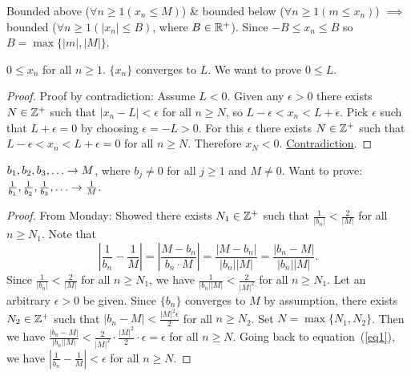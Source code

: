 \documentclass[]{article}
\begin{document}
Bounded above ($\forall n\geq1(x_n\leq M)$) \& bounded below ($\forall n\geq 1(m\leq x_n)$) $\implies $ bounded ($\forall n\geq 1(|x_n|\leq B)$, where $B\in\mathbb{R}^+$). Since $-B\leq x_n \leq B$ so $B=\max{\{|m|,|M|\}}$.
\begin{example}
	[Exam 1, 8.] $0\leq x_n$ for all $n\geq 1$. $\{x_n\}$ converges to $L$. We want to prove \ul{$0\leq L$}. 
\end{example}
\begin{proof}
	Proof by contradiction: Assume $L<0$. Given any $\epsilon>0$ there exists $N\in\mathbb{Z}^+$ such that $|x_n - L|<\epsilon$ for all $n\geq N$, so $L-\epsilon<x_n<L+\epsilon$. Pick $\epsilon$ such that $L+\epsilon=0$ by choosing $\epsilon=-L>0$. For this $\epsilon$ there exists $N\in \mathbb{Z}^+$ such that $L-\epsilon<x_n<L+\epsilon=0$ for all $n\geq N$. Therefore $x_N<0$. \ul{Contradiction}.
\end{proof}
\begin{recall}
	$b_1, b_2, b_3,\dots \ra M$, where $b_j \neq 0$ for all $j\geq 1$ and $M\neq0$. Want to prove: $\frac{1}{b_1},\frac{1}{b_2},\frac{1}{b_3},\dots \ra \frac{1}{M}$. 
\end{recall}
\begin{proof}
	From Monday: Showed there exists $N_1 \in \mathbb{Z}^+$ such that $\frac{1}{|b_n|}<\frac{2}{|M|}$ for all $n\geq N_1$. Note that
	\begin{equation}
		\left|\frac{1}{b_n}-\frac{1}{M}\right| = \left| \frac{M-b_n}{b_n\cdot M}\right| = \frac{|M-b_n|}{|b_n||M|} = \frac{|b_n-M|}{|b_n||M|}.
		\label{eq1}
	\end{equation}
	Since $\frac{1}{|b_n|}<\frac{2}{|M|}$ %
	for all $n\geq N_1$, we have %
	$\frac{1}{|b_n||M|} < \frac{2}{|M|^2}$ for all $n\geq N_1$.
	Let an arbitrary $\epsilon>0$ be given. Since $\{b_n\}$ converges to $M$ by assumption, there exists $N_2\in \mathbb{Z}^+$ such that $|b_n-M|<\frac{|M|^2\epsilon}{2}$ for all $n\geq N_2$. 
	Set $N=\max{\{N_1,N_2\}}$. Then we have $\frac{|b_n-M|}{|b_n||M|}<\frac{2}{|M|^2} \cdot \frac{|M|^2}{2}\cdot \epsilon = \epsilon$ for all $n\geq N$. Going back to equation~(\ref{eq1}), we have
	$\left| \frac{1}{b_n}-\frac{1}{M} \right| < \epsilon$ for all $n\geq N$.
\end{proof}
\end{document}
